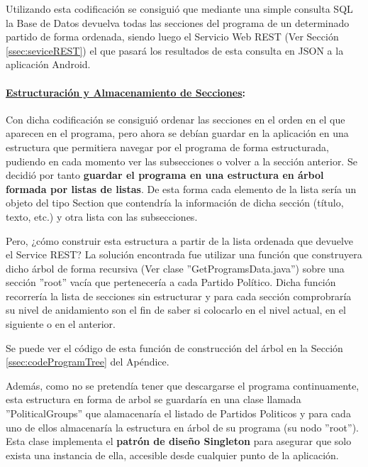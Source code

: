 	Utilizando esta codificación se consiguió que mediante una simple consulta SQL la Base de Datos devuelva todas las secciones del programa de un determinado partido de forma ordenada, siendo luego el Servicio Web REST (Ver Sección \ref{ssec:seviceREST}) el que pasará los resultados de esta consulta en JSON a la aplicación Android. \\ 
	
	\paragraph{\underline{Estructuración y Almacenamiento de Secciones}:}
	
	Con dicha codificación se consiguió ordenar las secciones en el orden en el que aparecen en el programa, pero ahora se debían guardar en la aplicación en una estructura que permitiera navegar por el programa de forma estructurada, pudiendo en cada momento ver las subsecciones o volver a la sección anterior. Se decidió por tanto \textbf{guardar el programa en una estructura en árbol formada por listas de listas}. De esta forma cada elemento de la lista sería un objeto del tipo Section que contendría la información de dicha sección (título, texto, etc.) y otra lista con las subsecciones.
	
	Pero, ¿cómo construir esta estructura a partir de la lista ordenada que devuelve el Service REST? La solución encontrada fue utilizar una función que construyera dicho árbol de forma recursiva (Ver clase ''GetProgramsData.java'') sobre una sección ''root'' vacía que pertenecería a cada Partido Político. Dicha función recorrería la lista de secciones sin estructurar y para cada sección comprobraría su nivel de anidamiento son el fin de saber si colocarlo en el nivel actual, en el siguiente o en el anterior.
	
	Se puede ver el código de esta función de construcción del árbol en la Sección \ref{ssec:codeProgramTree} del Apéndice.
	  
	Además, como no se pretendía tener que descargarse el programa continuamente, esta estructura en forma de arbol se guardaría en una clase llamada ''PoliticalGroups'' que alamacenaría el listado de Partidos Politicos y para cada uno de ellos almacenaría la estructura en árbol de su programa (su nodo ''root''). Esta clase implementa el \textbf{patrón de diseño Singleton} para asegurar que solo exista una instancia de ella, accesible desde cualquier punto de la aplicación. 
	  
